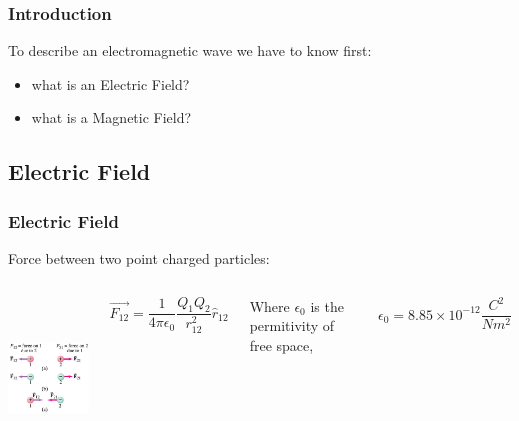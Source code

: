 \documentclass[]{beamer}
\begin{document}


\begin{frame}
\frametitle{Introduction}

To describe an electromagnetic wave we have to know first:
\pause

\begin{itemize}
 \item what is an Electric Field? 
\pause 

\item what is a Magnetic Field? 
\end{itemize}


  \end{frame}
\subsection{Electric Field}

\begin{frame}
\frametitle{Electric Field}

Force between two point charged particles:
\vspace{3mm}

\pause

   \begin{columns}[c]
   \column{2in}  %

    \begin{center}
  \includegraphics[height=1.7in]{images5/1.jpg}
\end{center}



   \column{2in}
\pause

\begin{equation}
\vec{F_{12}}=\frac{1}{4\pi \epsilon_0}\frac{Q_1Q_2}{r_{12}^2}\hat{r}_{12}
\end{equation}
\pause


Where $\epsilon_0$ is the permitivity of free space,
\pause

\begin{equation}
\epsilon_0=8.85\times10^{-12} \frac{C^2}{Nm^2}
\end{equation}



   \end{columns}






  \end{frame}
\end{document}
